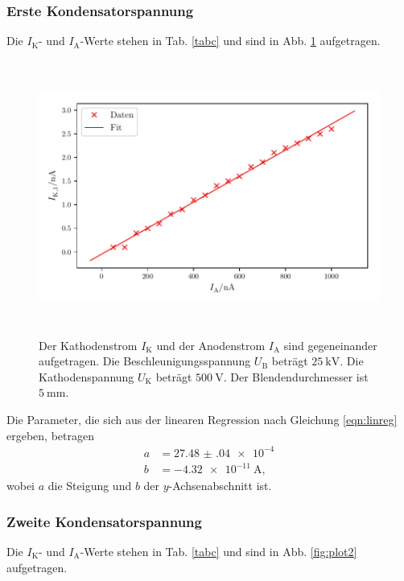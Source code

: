 \subsubsection{Erste Kondensatorspannung}
Die $I_\text{K}$- und $I_\text{A}$-Werte stehen in Tab. \ref{tabc} und sind in Abb. \ref{fig:plot1} aufgetragen. 



\begin{figure}
    \centering
    \includegraphics[width=15cm, height=9cm]{build/plot1.pdf}
    \caption{Der Kathodenstrom $I_\text{K}$ und der Anodenstrom $I_\text{A}$ sind gegeneinander aufgetragen. Die Beschleunigungsspannung $U_\text{B}$ beträgt $\SI{25}{\kilo\volt}$. Die Kathodenspannung $U_\text{K}$ beträgt $\SI{500}{\volt}$. Der Blendendurchmesser ist $\SI{5}{\milli\meter}.$}
    \label{fig:plot1}
\end{figure}

\noindent Die Parameter, die sich aus der linearen Regression nach Gleichung \eqref{eqn:linreg} ergeben, betragen
\begin{align*}
    a &= \num{27.48(04)e-4}\\
    b &= \SI{-4.32e-11}{\ampere},
\end{align*}
wobei $a$ die Steigung und $b$ der $y$-Achsenabschnitt ist. 

\subsubsection{Zweite Kondensatorspannung}
Die $I_\text{K}$- und $I_\text{A}$-Werte stehen in Tab. \ref{tabc} und sind in Abb. \ref{fig:plot2} aufgetragen. 

